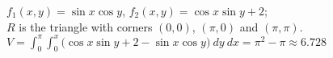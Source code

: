 {$f_1(x,y) = \sin x\cos y$, $f_2(x,y) = \cos x\sin y+2$;\\
$R$ is the triangle with corners $(0,0)$, $(\pi,0)$ and $(\pi,\pi)$.
}
{$V = \int_{0}^{\pi}\int_{0}^x \big(\cos x\sin y+2-\sin x\cos y\big)\ dy\ dx = \pi^2-\pi\approx 6.728$
}
